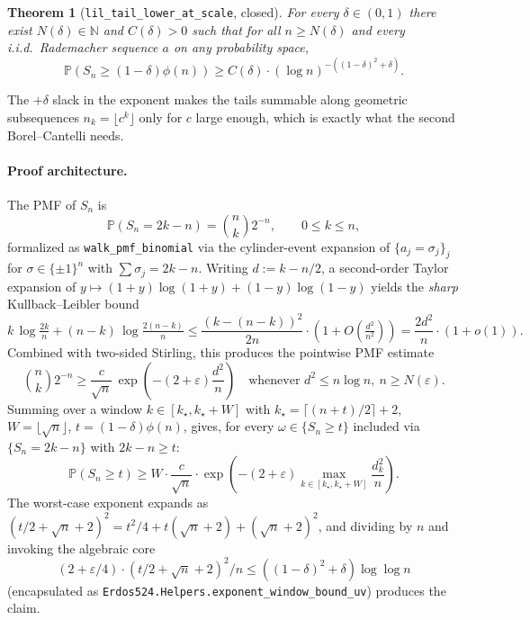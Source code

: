 \documentclass[11pt]{article}
\theoremstyle{plain}
\newtheorem{theorem}{Theorem}
\theoremstyle{definition}
\theoremstyle{remark}
\newcommand{\N}{\mathbb{N}}
\newcommand{\PP}{\mathbb{P}}
\newcommand{\eps}{\varepsilon}
\begin{document}
\begin{theorem}[\texttt{lil\_tail\_lower\_at\_scale}, closed]\label{thm:tail}
For every $\delta \in (0,1)$ there exist $N(\delta) \in \N$ and
$C(\delta) > 0$ such that for all $n \ge N(\delta)$ and every i.i.d.\
Rademacher sequence $a$ on any probability space,
\[
  \PP\!\left(S_n \ge (1-\delta)\phi(n)\right)
  \ge C(\delta)\cdot (\log n)^{-((1-\delta)^2 + \delta)}.
\]
\end{theorem}

The $+\delta$ slack in the exponent makes the tails summable along
geometric subsequences $n_k = \lfloor c^k\rfloor$ only for $c$ large
enough, which is exactly what the second Borel–Cantelli needs.

\paragraph{Proof architecture.} The PMF of $S_n$ is
\[
  \PP(S_n = 2k-n) = \binom{n}{k} 2^{-n}, \qquad 0 \le k \le n,
\]
formalized as \texttt{walk\_pmf\_binomial} via the cylinder-event
expansion of $\{a_j = \sigma_j\}_j$ for $\sigma \in \{\pm 1\}^n$ with
$\sum \sigma_j = 2k-n$. Writing $d := k - n/2$, a second-order Taylor
expansion of $y \mapsto (1+y)\log(1+y) + (1-y)\log(1-y)$ yields the
\emph{sharp} Kullback–Leibler bound
\begin{equation}\label{eq:KL-sharp}
  k\,\log\!\tfrac{2k}{n} + (n-k)\,\log\!\tfrac{2(n-k)}{n}
    \le \frac{(k-(n-k))^2}{2n}\cdot\left(1 + O\!\left(\tfrac{d^2}{n^2}\right)\right)
    = \frac{2d^2}{n}\cdot(1+o(1)).
\end{equation}
Combined with two-sided Stirling, this produces the pointwise
PMF estimate
\begin{equation}\label{eq:PMF-sharp}
  \binom{n}{k} 2^{-n} \ge \frac{c}{\sqrt n}\,\exp\!\left(-(2+\eps)\frac{d^2}{n}\right)
  \quad\text{whenever } d^2 \le n\log n,\ n \ge N(\eps).
\end{equation}
Summing over a window $k \in [k_\star, k_\star+W]$ with
$k_\star = \lceil(n+t)/2\rceil+2$, $W = \lfloor\sqrt n\rfloor$,
$t = (1-\delta)\phi(n)$, gives, for every $\omega \in
\{S_n\ge t\}$ included via $\{S_n = 2k-n\}$ with $2k-n\ge t$:
\[
  \PP(S_n \ge t) \ge W\cdot \frac{c}{\sqrt n}\cdot
    \exp\!\left(-(2+\eps)\!\max_{k\in[k_\star,k_\star+W]}\!\frac{d_k^2}{n}\right).
\]
The worst-case exponent expands as
$(t/2+\sqrt n+2)^2 = t^2/4 + t(\sqrt n+2) + (\sqrt n+2)^2$, and dividing
by $n$ and invoking the algebraic core
\[
  (2+\eps/4)\!\cdot\!(t/2+\sqrt n+2)^2/n
    \le ((1-\delta)^2 + \delta)\log\log n
\]
(encapsulated as \texttt{Erdos524.Helpers.exponent\_window\_bound\_uv})
produces the claim.
\end{document}
